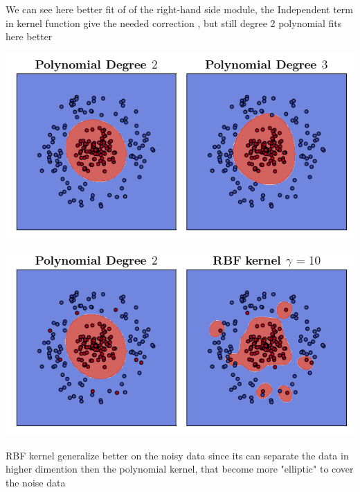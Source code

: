 \documentclass[12pt]{article}
\theoremstyle{plain}
\begin{document}
\begin{minipage}{0.4\textwidth}
We can see here better fit of of the right-hand side module, the Independent term in kernel function give the needed correction , but still degree 2 polynomial fits here better
\end{minipage}
\hspace{0.05\textwidth}
\noindent \begin{minipage}{0.5\textwidth}
\vspace{1cm}
\includegraphics[width=\textwidth]{plot 4.2.png}
\label{fig:2}
\end{minipage}
\noindent \begin{minipage}{0.5\textwidth}
\vspace{1cm}
\includegraphics[width=\textwidth]{plot 4.3.png}
\label{fig:3}
\end{minipage}
\hspace{0.05\textwidth}
\begin{minipage}{0.4\textwidth}
RBF kernel generalize better on the noisy data 
since its can separate the data in higher dimention then the polynomial
kernel, that become more "elliptic" to cover the noise data
\end{minipage}
\end{document}
